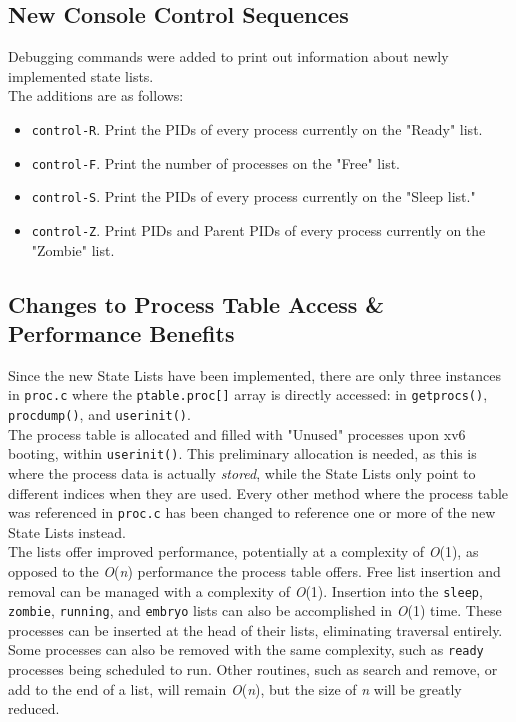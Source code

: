 \documentclass[11pt,letterpaper]{report}
\begin{document}
	\subsection{New Console Control Sequences}
	Debugging commands were added to print out information about newly implemented state lists.\\
	The additions are as follows:
	\begin{itemize}
		\item {\tt control-R}. Print the PIDs of every process currently on the "Ready" list.
		\item {\tt control-F}. Print the number of processes on the "Free" list.
		\item {\tt control-S}. Print the PIDs of every process currently on the "Sleep list."
		\item {\tt control-Z}. Print PIDs and Parent PIDs of every process currently on the "Zombie" list.
	\end{itemize}
	
	\subsection{Changes to Process Table Access \& Performance Benefits}
	Since the new State Lists have been implemented, there are only three instances in {\tt proc.c} where the {\tt ptable.proc[]} array is directly accessed: in {\tt getprocs()}, {\tt procdump()}, and {\tt userinit()}.\\
	The process table is allocated and filled with "Unused" processes upon xv6 booting, within {\tt userinit()}. This preliminary allocation is needed, as this is where the process data is actually \emph{stored}, while the State Lists only point to different indices when they are used. Every other method where the process table was referenced in {\tt proc.c} has been changed to reference one or more of the new State Lists instead.\\
	The lists offer improved performance, potentially at a complexity of \emph{O}(1), as opposed to the \emph{O}(\emph{n}) performance the process table offers. Free list insertion and removal can be managed with a complexity of \emph{O}(1). Insertion into the {\tt sleep}, {\tt zombie}, {\tt running}, and {\tt embryo} lists can also be accomplished in \emph{O}(1) time. These processes can be inserted at the head of their lists, eliminating traversal entirely. Some processes can also be removed with the same complexity, such as {\tt ready} processes being scheduled to run. Other routines, such as search and remove, or add to the end of a list, will remain \emph{O}(\emph{n}), but the size of \emph{n} will be greatly reduced.
	
\end{document}
